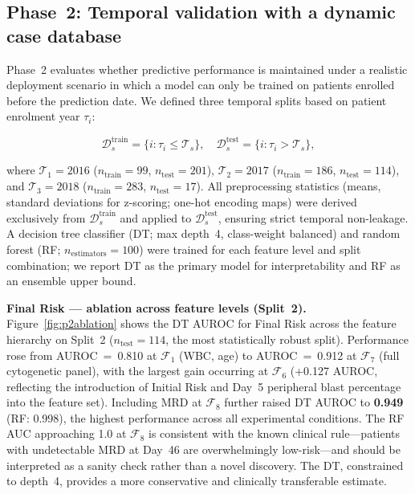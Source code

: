 \documentclass[pdflatex,sn-nature]{sn-jnl}
\begin{document}
\subsection{Phase~2: Temporal validation with a dynamic case database}
\label{sec:phase2}

Phase~2 evaluates whether predictive performance is maintained under a
realistic deployment scenario in which a model can only be trained on
patients enrolled before the prediction date.
We defined three temporal splits based on patient enrolment year
$\tau_i$:

\begin{equation}
\mathcal{D}_s^{\text{train}} = \{i : \tau_i \leq \mathcal{T}_s\},
\quad
\mathcal{D}_s^{\text{test}} = \{i : \tau_i > \mathcal{T}_s\},
\label{eq:splits}
\end{equation}

where $\mathcal{T}_1 = 2016$ ($n_{\text{train}}=99$,
$n_{\text{test}}=201$), $\mathcal{T}_2 = 2017$
($n_{\text{train}}=186$, $n_{\text{test}}=114$), and
$\mathcal{T}_3 = 2018$ ($n_{\text{train}}=283$, $n_{\text{test}}=17$).
All preprocessing statistics (means, standard deviations for
z-scoring; one-hot encoding maps) were derived exclusively from
$\mathcal{D}_s^{\text{train}}$ and applied to $\mathcal{D}_s^{\text{test}}$,
ensuring strict temporal non-leakage.
A decision tree classifier (DT; max depth~4, class-weight balanced) and
random forest (RF; $n_{\text{estimators}}=100$) were trained for each
feature level and split combination; we report DT as the primary model
for interpretability and RF as an ensemble upper bound.

\textbf{Final Risk — ablation across feature levels (Split~2).}
Figure~\ref{fig:p2ablation} shows the DT AUROC for Final Risk
across the feature hierarchy on Split~2 ($n_{\text{test}}=114$, the
most statistically robust split).
Performance rose from AUROC~=~0.810 at $\mathcal{F}_1$ (WBC, age) to
AUROC~=~0.912 at $\mathcal{F}_7$ (full cytogenetic panel), with the
largest gain occurring at $\mathcal{F}_6$ (+0.127 AUROC, reflecting
the introduction of Initial Risk and Day~5 peripheral blast percentage
into the feature set).
Including MRD at $\mathcal{F}_8$ further raised DT AUROC to
\textbf{0.949} (RF: 0.998), the highest performance across all
experimental conditions.
The RF AUC approaching 1.0 at $\mathcal{F}_8$ is consistent with the
known clinical rule—patients with undetectable MRD at Day~46 are
overwhelmingly low-risk—and should be interpreted as a sanity check
rather than a novel discovery.
The DT, constrained to depth~4, provides a more conservative and
clinically transferable estimate.
\end{document}
